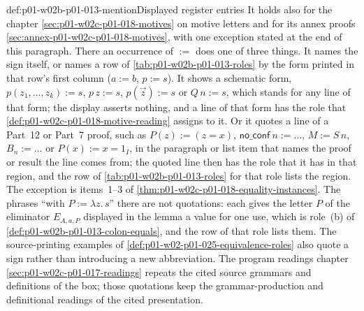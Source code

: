 \begin{hbconvention}{def:p01-w02b-p01-013-mention}{Displayed register entries}
It holds also for the chapter \cref{sec:p01-w02c-p01-018-motives} on motive
letters and for its annex proofs \cref{sec:annex-p01-w02c-p01-018-motives},
with one exception stated at the end of this paragraph.  There an
occurrence of \(:=\) does one of three things.  It names the sign itself,
or names a row of \cref{tab:p01-w02b-p01-013-roles} by the form printed in
that row's first column (\(a:=b\), \(p:=s\)).  It shows a schematic form,
\(p(z_1,\ldots,z_k):=s\), \(p\,z:=s\), \(p(\vec z):=s\) or \(Q\,n:=s\),
which stands for any line of that form; the display asserts nothing, and a
line of that form has the role that
\cref{def:p01-w02c-p01-018-motive-reading} assigns to it.  Or it quotes a
line of a Part~12 or Part~7 proof, such as \(P(z):=(z=x)\),
\(\mathsf{no\_conf}\ n:=\ldots\), \(M:=S\,n\), \(B_n:=\ldots\) or
\(P(x):=x=1_I\), in the
paragraph or list item that names the proof or result the line comes from;
the quoted line then has the role that it has in that region, and the row
of \cref{tab:p01-w02b-p01-013-roles} for that role lists the region.  The
exception is items~1--3 of \cref{thm:p01-w02c-p01-018-equality-instances}.
The phrases ``with \(P:=\lambda z.\,s\)'' there are not quotations: each
gives the letter \(P\) of the eliminator \(E_{A,a,P}\) displayed in the
lemma a value for one use, which is role~(b) of
\cref{def:p01-w02b-p01-013-colon-equals}, and the row of that role lists
them.
The source-printing examples of
\cref{def:p01-w02-p01-025-equivalence-roles} also quote a sign rather
than introducing a new abbreviation.  The program readings chapter
\cref{sec:p01-w02c-p01-017-readings} repeats the cited source grammars
and definitions of the box; those quotations keep the grammar-production
and definitional readings of the cited presentation.
\end{hbconvention}


